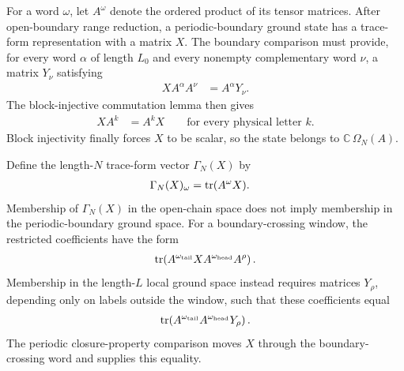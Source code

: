 \documentclass{article}
\begin{document}
For a word $\omega$, let $A^\omega$ denote the ordered product of its tensor
matrices. After open-boundary range reduction, a periodic-boundary ground
state has a trace-form representation with a matrix $X$. The boundary
comparison must provide, for every word $\alpha$ of length $L_0$ and every
nonempty complementary word $\nu$, a matrix $Y_\nu$ satisfying
\begin{align}
    XA^\alpha A^\nu
        &= A^\alpha Y_\nu.
    \label{eq:cpgsv21_normal_range_reduction_block_window_matrix_identity}
\end{align}
The block-injective commutation lemma then gives
\begin{align}
    XA^k
        &= A^kX
        \qquad\text{for every physical letter $k$}.
    \label{eq:cpgsv21_normal_range_reduction_one_site_commutation}
\end{align}
Block injectivity finally forces $X$ to be scalar, so the state belongs to
$\mathbb C\,\Omega_N(A)$.

Define the length-$N$ trace-form vector $\Gamma_N(X)$ by
\begin{align}
    \Gamma_N(X)_\omega
        &= \operatorname{tr}(A^\omega X).
    \label{eq:cpgsv21_normal_range_reduction_trace_form_vector}
\end{align}
Membership of $\Gamma_N(X)$ in the open-chain space does not imply membership
in the periodic-boundary ground space. For a boundary-crossing window, the
restricted coefficients have the form
\begin{align}
    \operatorname{tr}\!\left(A^{\omega_{\mathrm{tail}}}X
        A^{\omega_{\mathrm{head}}}A^\rho\right).
    \label{eq:cpgsv21_normal_range_reduction_boundary_crossing_coefficient}
\end{align}
Membership in the length-$L$ local ground space instead requires matrices
$Y_\rho$, depending only on labels outside the window, such that these
coefficients equal
\begin{align}
    \operatorname{tr}\!\left(A^{\omega_{\mathrm{tail}}}
        A^{\omega_{\mathrm{head}}}Y_\rho\right).
    \label{eq:cpgsv21_normal_range_reduction_local_ground_space_coefficient}
\end{align}
The periodic closure-property comparison moves $X$ through the
boundary-crossing word and supplies this equality.
\end{document}
